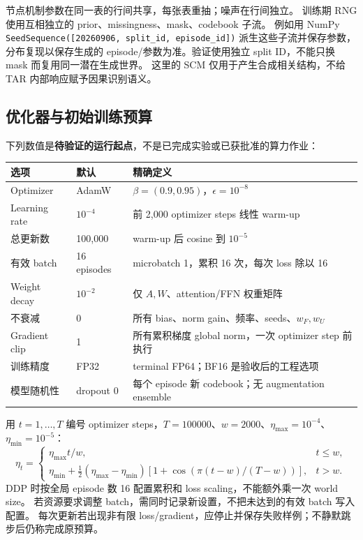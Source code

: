 \documentclass[11pt,UTF8,fontset=fandol]{ctexart}
\begin{document}
节点机制参数在同一表的行间共享，每张表重抽；噪声在行间独立。
训练期 RNG 使用互相独立的 prior、missingness、mask、codebook 子流。
例如用 NumPy \texttt{SeedSequence([20260906, split\_id, episode\_id])} 派生这些子流并保存参数，
分布复现以保存生成的 episode/参数为准。验证使用独立 split ID，不能只换 mask 而复用同一潜在生成世界。
这里的 SCM 仅用于产生合成相关结构，不给 TAR 内部响应赋予因果识别语义。

\subsection{优化器与初始训练预算}
下列数值是\textbf{待验证的运行起点}，不是已完成实验或已获批准的算力作业：
\begin{table}[htbp]\centering\small
\begin{tabularx}{\linewidth}{@{}l l Y@{}}\toprule
选项 & 默认 & 精确定义 \\\midrule
Optimizer & AdamW & $\beta=(0.9,0.95)$，$\epsilon=10^{-8}$ \\
Learning rate & $10^{-4}$ & 前 2,000 optimizer steps 线性 warm-up \\
总更新数 & 100,000 & warm-up 后 cosine 到 $10^{-5}$ \\
有效 batch & 16 episodes & microbatch 1，累积 16 次，每次 loss 除以 16 \\
Weight decay & $10^{-2}$ & 仅 $A,W$、attention/FFN 权重矩阵 \\
不衰减 & 0 & 所有 bias、norm gain、频率、seeds、$w_F,w_U$ \\
Gradient clip & 1 & 所有累积梯度 global norm，一次 optimizer step 前执行 \\
训练精度 & FP32 & terminal FP64；BF16 是验收后的工程选项 \\
模型随机性 & dropout 0 & 每个 episode 新 codebook；无 augmentation ensemble \\\bottomrule
\end{tabularx}
\end{table}

用 $t=1,\ldots,T$ 编号 optimizer steps，$T=100000$、$w=2000$、$\eta_{\max}=10^{-4}$、
$\eta_{\min}=10^{-5}$：
\begin{equation}
 \eta_t=\begin{cases}
 \eta_{\max}t/w,&t\le w,\\
 \eta_{\min}+\tfrac12(\eta_{\max}-\eta_{\min})
 [1+\cos(\pi(t-w)/(T-w))],&t>w.
 \end{cases}
\end{equation}
DDP 时按全局 episode 数 16 配置累积和 loss scaling，不能额外乘一次 world size。
若资源要求调整 batch，需同时记录新设置，不把未达到的有效 batch 写入配置。
每次更新若出现非有限 loss/gradient，应停止并保存失败样例；不静默跳步后仍称完成原预算。
\end{document}

